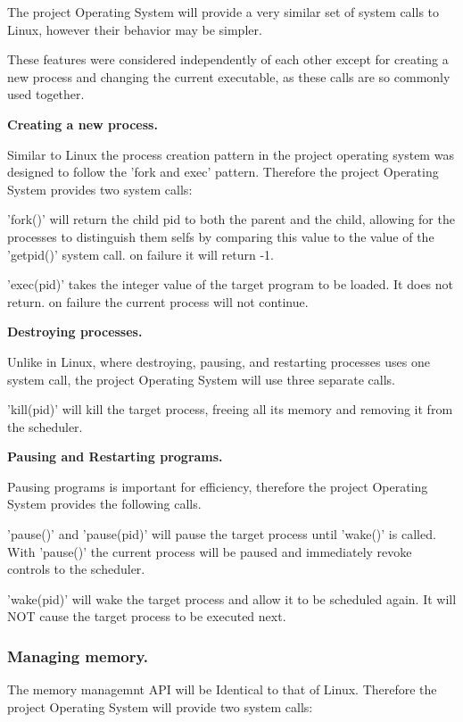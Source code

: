\documentclass[a4paper]{report}
\begin{document}
The project Operating System will provide a very similar set of system calls to Linux, however their behavior may be simpler.

These features were considered independently of each other except for creating a new process and changing the current executable, as these calls are so commonly used together. 

\textbf{Creating a new process.}

Similar to Linux the process creation pattern in the project operating system was designed to follow the 'fork and exec' pattern. Therefore the project Operating System provides two system calls:

'fork()' will return the child pid to both the parent and the child, allowing for the processes to distinguish them selfs by comparing this value to the value of the 'get\textunderscore pid()' system call. on failure it will return -1.

'exec(pid)' takes the integer value of the target program to be loaded. It does not return. on failure the current process will not continue.

\textbf{Destroying processes.}

Unlike in Linux, where destroying, pausing, and restarting processes uses one system call, the project Operating System will use three separate calls.

'kill(pid)' will kill the target process, freeing all its memory and removing it from the scheduler.

\textbf{Pausing and Restarting programs.}

Pausing programs is important for efficiency, therefore the project Operating System provides the following calls.

'pause()' and 'pause(pid)' will pause the target process until 'wake()' is called. With 'pause()' the current process will be paused and immediately revoke controls to the scheduler.

'wake(pid)' will wake the target process and allow it to be scheduled again. It will NOT cause the target process to be executed next.

\subsubsection*{Managing memory.}

The memory managemnt API will be Identical to that of Linux. Therefore the project Operating System will provide two system calls:
\end{document}
